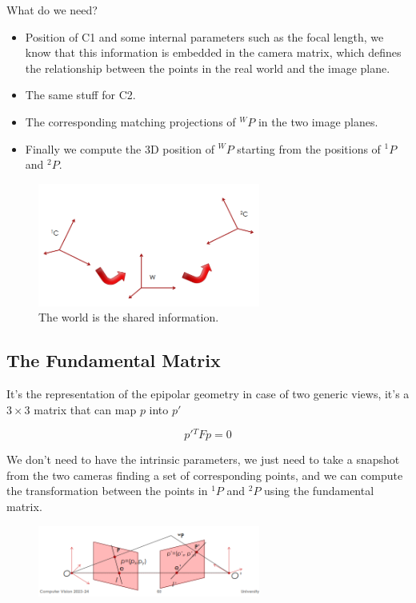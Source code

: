 What do we need?
\begin{itemize}
\item Position of C1 and some internal parameters such as the focal
length, we know that this information is embedded in the camera matrix, which defines the relationship between the points in the real world and the image plane.
\item The same stuff for C2.
\item The corresponding matching projections of \({}^WP\) in the two image planes.
\item Finally we compute the 3D position of \({}^WP\) starting from the positions of \({}^1P\) and \({}^2P\).
\end{itemize}
\begin{figure}[H]
    \centering
    \includegraphics[width=0.65\textwidth]{Figures/world.png}
    \caption{The world is the shared information.}
    \label{fig:world}
\end{figure}

\subsection{The Fundamental Matrix}

It's the representation of the epipolar geometry in case of two generic views, it's a \(3\times3\) matrix that can map \(p\) into \(p'\) 

\[
    p' {}^TFp=0
\]

We don't need to have the intrinsic parameters, we just need to take a snapshot from the two cameras finding a set of corresponding points, and we can compute the transformation between the points in \({}^1P\) and \({}^2P\) using the fundamental matrix. 

\begin{figure}[H]
    \centering
    \includegraphics[width=0.65\textwidth]{Figures/found.png}
    \label{fig:found}
\end{figure}

